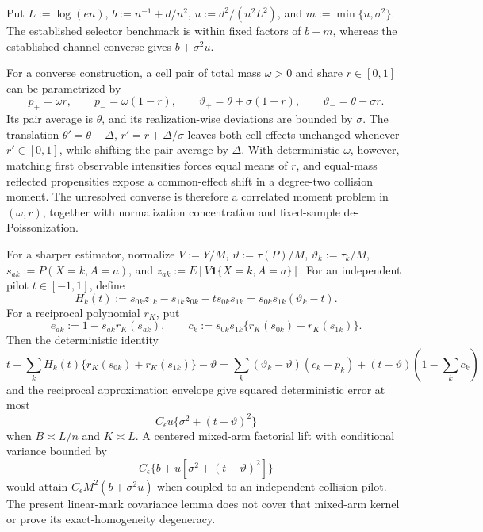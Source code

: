 Put \(L:=\log(en)\), \(b:=n^{-1}+d/n^2\), \(u:=d^2/(n^2L^2)\), and \(m:=\min\{u,\sigma^2\}\).  The established selector benchmark is within fixed factors of \(b+m\), whereas the established channel converse gives \(b+\sigma^2u\).

For a converse construction, a cell pair of total mass \(\omega>0\) and share \(r\in[0,1]\) can be parametrized by
\[
 p_+=\omega r,\qquad p_-=\omega(1-r),\qquad
 \vartheta_+=\theta+\sigma(1-r),\qquad
 \vartheta_-=\theta-\sigma r.
\]
Its pair average is \(\theta\), and its realization-wise deviations are bounded by \(\sigma\).  The translation \(\theta'=\theta+\Delta\), \(r'=r+\Delta/\sigma\) leaves both cell effects unchanged whenever \(r'\in[0,1]\), while shifting the pair average by \(\Delta\).  With deterministic \(\omega\), however, matching first observable intensities forces equal means of \(r\), and equal-mass reflected propensities expose a common-effect shift in a degree-two collision moment.  The unresolved converse is therefore a correlated moment problem in \((\omega,r)\), together with normalization concentration and fixed-sample de-Poissonization.

For a sharper estimator, normalize \(V:=Y/M\), \(\vartheta:=\tau(P)/M\), \(\vartheta_k:=\tau_k/M\), \(s_{ak}:=P(X=k,A=a)\), and \(z_{ak}:=E[V\mathbf 1\{X=k,A=a\}]\).  For an independent pilot \(t\in[-1,1]\), define
\[
 H_k(t):=s_{0k}z_{1k}-s_{1k}z_{0k}-ts_{0k}s_{1k}
 =s_{0k}s_{1k}(\vartheta_k-t).
\]
For a reciprocal polynomial \(r_K\), put
\[
 e_{ak}:=1-s_{ak}r_K(s_{ak}),\qquad
 c_k:=s_{0k}s_{1k}\{r_K(s_{0k})+r_K(s_{1k})\}.
\]
Then the deterministic identity
\[
 t+\sum_kH_k(t)\{r_K(s_{0k})+r_K(s_{1k})\}-\vartheta
 =\sum_k(\vartheta_k-\vartheta)(c_k-p_k)
 +(t-\vartheta)\left(1-\sum_kc_k\right)
\]
and the reciprocal approximation envelope give squared deterministic error at most
\[
 C_\epsilon u\{\sigma^2+(t-\vartheta)^2\}
\]
when \(B\asymp L/n\) and \(K\asymp L\).  A centered mixed-arm factorial lift with conditional variance bounded by
\[
 C_\epsilon\{b+u[\sigma^2+(t-\vartheta)^2]\}
\]
would attain \(C_\epsilon M^2(b+\sigma^2u)\) when coupled to an independent collision pilot.  The present linear-mark covariance lemma does not cover that mixed-arm kernel or prove its exact-homogeneity degeneracy.